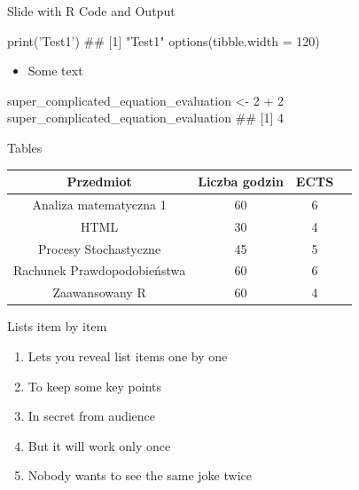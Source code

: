\documentclass[ignorenonframetext,]{beamer}
\newenvironment{Shaded}{}{}
\newcommand{\KeywordTok}[1]{\textcolor[rgb]{0.00,0.00,1.00}{#1}}
\newcommand{\DataTypeTok}[1]{#1}
\newcommand{\DecValTok}[1]{#1}
\newcommand{\StringTok}[1]{\textcolor[rgb]{0.00,0.50,0.50}{#1}}
\newcommand{\OperatorTok}[1]{#1}
\newcommand{\NormalTok}[1]{#1}
\providecommand{\tightlist}{%
  \setlength{\itemsep}{0pt}\setlength{\parskip}{0pt}}
\begin{document}
\begin{frame}[fragile]{Slide with R Code and Output}

\scriptsize

\begin{Shaded}
\begin{Highlighting}[]
\KeywordTok{print}\NormalTok{(}\StringTok{'Test1'}\NormalTok{)}
\NormalTok{## [1] "Test1"}
\KeywordTok{options}\NormalTok{(}\DataTypeTok{tibble.width =} \DecValTok{120}\NormalTok{)}
\end{Highlighting}
\end{Shaded}

\begin{itemize}
\tightlist
\item
  Some text
\end{itemize}

\scriptsize

\begin{Shaded}
\begin{Highlighting}[]
\NormalTok{super_complicated_equation_evaluation <-}\StringTok{ }\DecValTok{2} \OperatorTok{+}\StringTok{ }\DecValTok{2}
\NormalTok{super_complicated_equation_evaluation}
\NormalTok{## [1] 4}
\end{Highlighting}
\end{Shaded}

\end{frame}

\begin{frame}{Tables}

\begin{longtable}[]{@{}cccc@{}}
\toprule
Przedmiot & Liczba godzin & ECTS &\tabularnewline
\midrule
\endhead
Analiza matematyczna 1 & 60 & 6 &\tabularnewline
HTML & 30 & 4 &\tabularnewline
Procesy Stochastyczne & 45 & 5 &\tabularnewline
Rachunek Prawdopodobieństwa & 60 & 6 &\tabularnewline
Zaawansowany R & 60 & 4 &\tabularnewline
\bottomrule
\end{longtable}

\end{frame}

\begin{frame}{Lists item by item}

\begin{enumerate}[<+->]
\def\labelenumi{\arabic{enumi}.}
\tightlist
\item
  Lets you reveal list items one by one
\item
  To keep some key points
\item
  In secret from audience
\item
  But it will work only once
\item
  Nobody wants to see the same joke twice
\end{enumerate}

\end{frame}
\end{document}
